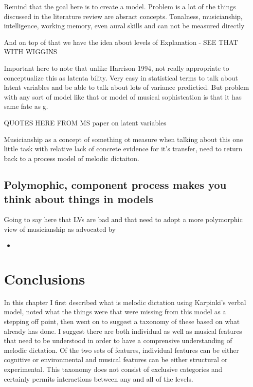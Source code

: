 \documentclass[]{book}
\providecommand{\tightlist}{%
  \setlength{\itemsep}{0pt}\setlength{\parskip}{0pt}}
\theoremstyle{definition}
\theoremstyle{definition}
\theoremstyle{definition}
\theoremstyle{remark}
\begin{document}
Remind that the goal here is to create a model. Problem is a lot of the
things discussed in the literature review are absract concepts.
Tonalness, musicianship, intelligence, working memory, even aural skills
and can not be measured directly

And on top of that we have the idea about levels of Explanation - SEE
THAT WITH WIGGINS

Important here to note that unlike Harrison 1994, not really appropriate
to conceptualize this as latenta bility. Very easy in statistical terms
to talk about latent variables and be able to talk about lots of
variance predictied. But problem with any sort of model like that or
model of musical sophistcation is that it has same fate as g.

QUOTES HERE FROM MS paper on latent variables

Musicianship as a concept of something ot measure when talking about
this one little task with relative lack of concrete evidence for it's
transfer, need to return back to a process model of melodic dictaiton.

\hypertarget{polymophic-component-process-makes-you-think-about-things-in-models}{%
\subsection{Polymophic, component process makes you think about things
in
models}\label{polymophic-component-process-makes-you-think-about-things-in-models}}

Going to say here that LVs are bad and that need to adopt a more
polymorphic view of musicianship as advocated by

\begin{itemize}
\tightlist
\item
  \citep{levitinWhatDoesIt2012, peretzModularityMusicProcessing2003}
\end{itemize}

\hypertarget{conclusions}{%
\section{Conclusions}\label{conclusions}}

In this chapter I first described what is melodic dictation using
Karpinki's verbal model, noted what the things were that were missing
from this model as a stepping off point, then went on to suggest a
taxonomy of these based on what already has done. I suggest there are
both individual as well as musical features that need to be understood
in order to have a comprensive understanding of melodic dictation. Of
the two sets of features, individual features can be either cognitive or
environmental and musical features can be either structural or
experimental. This taxonomy does not consist of exclusive categories and
certainly permits interactions between any and all of the levels.
\end{document}

